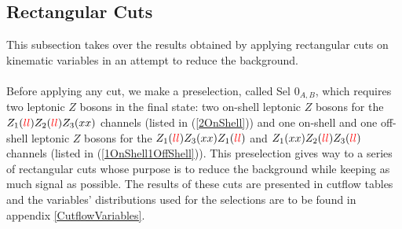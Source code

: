 \documentclass[a4paper,11pt]{article}
\begin{document}
    \subsection{Rectangular Cuts} \label{RectangularCuts}
    This subsection takes over the results obtained by applying rectangular cuts on kinematic variables in an attempt to reduce 
    the background.\\\\
    Before applying any cut, we make a preselection, called Sel 0$_{A,B}$, which requires two leptonic $Z$ bosons in the final state: two on-shell leptonic $Z$ bosons for the $Z_1(\textcolor{red}{ll})Z_2(\textcolor{red}{ll})Z_3(xx)$ channels (listed in  (\ref{2OnShell})) and one on-shell and one off-shell leptonic $Z$ bosons for the $Z_1(\textcolor{red}{ll})Z_3(xx)Z_1(\textcolor{red}{ll})$ and $Z_1(xx)Z_2(\textcolor{red}{ll})Z_3(\textcolor{red}{ll})$ channels (listed in (\ref{1OnShell1OffShell})). This preselection gives way to a series of rectangular cuts whose purpose is to reduce the background while keeping as much signal as possible. The results of these cuts are presented in cutflow tables and the variables' distributions used for the selections are to be found in appendix \ref{CutflowVariables}.
\end{document}
